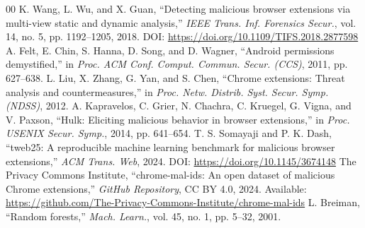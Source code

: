 \documentclass[conference]{IEEEtran}
\begin{document}
\begin{thebibliography}{00}
 K. Wang, L. Wu, and X. Guan, ``Detecting malicious browser extensions via multi-view static and dynamic analysis,'' \emph{IEEE Trans. Inf. Forensics Secur.}, vol. 14, no. 5, pp. 1192--1205, 2018. DOI: \url{https://doi.org/10.1109/TIFS.2018.2877598}
 A. Felt, E. Chin, S. Hanna, D. Song, and D. Wagner, ``Android permissions demystified,'' in \emph{Proc. ACM Conf. Comput. Commun. Secur. (CCS)}, 2011, pp. 627--638.
 L. Liu, X. Zhang, G. Yan, and S. Chen, ``Chrome extensions: Threat analysis and countermeasures,'' in \emph{Proc. Netw. Distrib. Syst. Secur. Symp. (NDSS)}, 2012.
 A. Kapravelos, C. Grier, N. Chachra, C. Kruegel, G. Vigna, and V. Paxson, ``Hulk: Eliciting malicious behavior in browser extensions,'' in \emph{Proc. USENIX Secur. Symp.}, 2014, pp. 641--654.
 T. S. Somayaji and P. K. Dash, ``tweb25: A reproducible machine learning benchmark for malicious browser extensions,'' \emph{ACM Trans. Web}, 2024. DOI: \url{https://doi.org/10.1145/3674148}
 The Privacy Commons Institute, ``chrome-mal-ids: An open dataset of malicious Chrome extensions,'' \emph{GitHub Repository}, CC BY 4.0, 2024. Available: \url{https://github.com/The-Privacy-Commons-Institute/chrome-mal-ids}
 L. Breiman, ``Random forests,'' \emph{Mach. Learn.}, vol. 45, no. 1, pp. 5--32, 2001.
\end{thebibliography}
\end{document}
